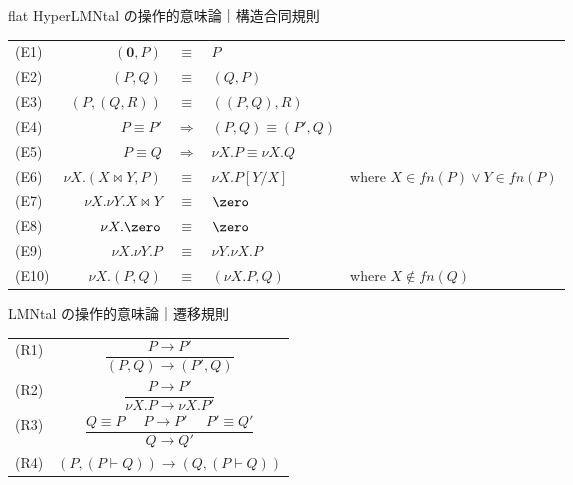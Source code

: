 \begin{frame}{flat HyperLMNtal の操作的意味論｜構造合同規則}
  \begin{center}
    \footnotesize
    \renewcommand{\arraystretch}{1.5}
    \begin{tabular}{ lrcll } 
      (E1)  & $(\mathbf{0}, P)$         &$\equiv$&      $P$\\
      (E2)  & $(P, Q)$                  &$\equiv$&      $(Q, P)$ \\
      (E3)  & $(P, (Q, R))$             &$\equiv$&      $((P, Q), R)$ \\
      (E4)  & $P \equiv P'$             &$\Rightarrow$& $(P, Q) \equiv (P', Q)$ \\
      (E5)  & $P \equiv Q$              &$\Rightarrow$& $\nu X.P \equiv \nu X.Q$ \\
      (E6)  & $\nu X.(X \bowtie Y, P)$  &$\equiv$&      $\nu X.P[Y / X]$
      & where \(X \in \mathit{fn}(P) \lor Y \in \mathit{fn}(P)\)\\
      (E7)  & $\nu X.\nu Y.X \bowtie Y$ &$\equiv$&      $\zero$ \\
      (E8)  & $\nu X.\zero$             &$\equiv$&      $\zero$\\
      (E9)  & $\nu X.\nu Y.P$           &$\equiv$&      $\nu Y.\nu X.P$\\
      (E10) & $\nu X.(P,Q)$             &$\equiv$&      $(\nu X.P,Q)$
       & where \(X \notin \mathit{fn}(Q)\)\\
    \end{tabular}
  \end{center}
\end{frame}

\begin{frame}{LMNtal の操作的意味論｜遷移規則}
  \begin{center}
    \renewcommand{\arraystretch}{1.8}
    \begin{tabular}{ lc } 
      (R1) & \(\dfrac{P \longrightarrow P'}{(P, Q) \longrightarrow  (P', Q)} \)
      \vspace{1em}\\
      (R2) & \(\dfrac{P \longrightarrow P'}{\nu X.P \longrightarrow  \nu X.P'} \)
      \vspace{1em} \\
      (R3) & \(\dfrac{Q \equiv P \hspace{16pt} P \longrightarrow P' \hspace{16pt} P' \equiv Q'}{Q \longrightarrow Q'} \)
      \vspace{0.5em} \\
      (R4) & \( (P, (P \vdash Q)) \longrightarrow (Q, (P \vdash Q)) \) \\
    \end{tabular}
  \end{center}
\end{frame}


